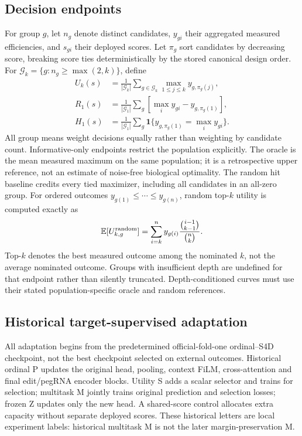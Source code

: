 \subsection{Decision endpoints}
For group $g$, let $n_g$ denote distinct candidates, $y_{gi}$ their aggregated measured efficiencies, and $s_{gi}$ their deployed scores. Let $\pi_g$ sort candidates by decreasing score, breaking score ties deterministically by the stored canonical design order. For $\mathcal G_k=\{g:n_g\geq\max(2,k)\}$, define
\begin{align}
U_k(s)&=\frac{1}{|\mathcal G_k|}\sum_{g\in\mathcal G_k}\max_{1\leq j\leq k}y_{g,\pi_g(j)},\\
R_1(s)&=\frac{1}{|\mathcal G_1|}\sum_g\left[\max_i y_{gi}-y_{g,\pi_g(1)}\right],\\
H_1(s)&=\frac{1}{|\mathcal G_1|}\sum_g\mathbf1\{y_{g,\pi_g(1)}=\max_i y_{gi}\}.
\end{align}
All group means weight decisions equally rather than weighting by candidate count. Informative-only endpoints restrict the population explicitly. The oracle is the mean measured maximum on the same population; it is a retrospective upper reference, not an estimate of noise-free biological optimality. The random hit baseline credits every tied maximizer, including all candidates in an all-zero group. For ordered outcomes $y_{g(1)}\leq\cdots\leq y_{g(n)}$, random top-$k$ utility is computed exactly as
\begin{equation}
\mathbb E[U_{k,g}^{\rm random}]=\sum_{i=k}^{n}y_{g(i)}\frac{\binom{i-1}{k-1}}{\binom{n}{k}}.
\end{equation}
Top-$k$ denotes the best measured outcome among the nominated $k$, not the average nominated outcome. Groups with insufficient depth are undefined for that endpoint rather than silently truncated. Depth-conditioned curves must use their stated population-specific oracle and random references.

\subsection{Historical target-supervised adaptation}
All adaptation begins from the predetermined official-fold-one ordinal--S4D checkpoint, not the best checkpoint selected on external outcomes. Historical ordinal P updates the original head, pooling, context FiLM, cross-attention and final edit/pegRNA encoder blocks. Utility S adds a scalar selector and trains for selection; multitask M jointly trains original prediction and selection losses; frozen Z updates only the new head. A shared-score control allocates extra capacity without separate deployed scores. These historical letters are local experiment labels: historical multitask M is not the later margin-preservation M.

